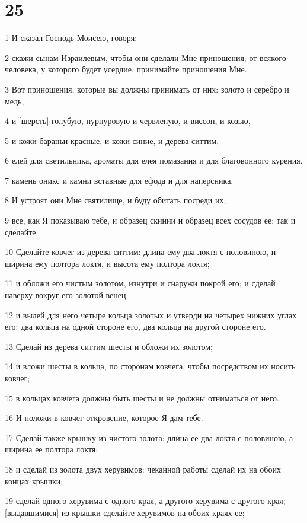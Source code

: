 \chapter{25}

\par 1 И сказал Господь Моисею, говоря:
\par 2 скажи сынам Израилевым, чтобы они сделали Мне приношения; от всякого человека, у которого будет усердие, принимайте приношения Мне.
\par 3 Вот приношения, которые вы должны принимать от них: золото и серебро и медь,
\par 4 и [шерсть] голубую, пурпуровую и червленую, и виссон, и козью,
\par 5 и кожи бараньи красные, и кожи синие, и дерева ситтим,
\par 6 елей для светильника, ароматы для елея помазания и для благовонного курения,
\par 7 камень оникс и камни вставные для ефода и для наперсника.
\par 8 И устроят они Мне святилище, и буду обитать посреди их;
\par 9 все, как Я показываю тебе, и образец скинии и образец всех сосудов ее; так и сделайте.
\par 10 Сделайте ковчег из дерева ситтим: длина ему два локтя с половиною, и ширина ему полтора локтя, и высота ему полтора локтя;
\par 11 и обложи его чистым золотом, изнутри и снаружи покрой его; и сделай наверху вокруг его золотой венец.
\par 12 и вылей для него четыре кольца золотых и утверди на четырех нижних углах его: два кольца на одной стороне его, два кольца на другой стороне его.
\par 13 Сделай из дерева ситтим шесты и обложи их золотом;
\par 14 и вложи шесты в кольца, по сторонам ковчега, чтобы посредством их носить ковчег;
\par 15 в кольцах ковчега должны быть шесты и не должны отниматься от него.
\par 16 И положи в ковчег откровение, которое Я дам тебе.
\par 17 Сделай также крышку из чистого золота: длина ее два локтя с половиною, а ширина ее полтора локтя;
\par 18 и сделай из золота двух херувимов: чеканной работы сделай их на обоих концах крышки;
\par 19 сделай одного херувима с одного края, а другого херувима с другого края; [выдавшимися] из крышки сделайте херувимов на обоих краях ее;
